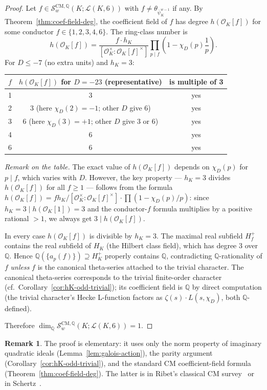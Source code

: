 \documentclass[11pt,a4paper]{amsart}
\theoremstyle{definition}
\newtheorem{remark}[theorem]{Remark}
\newcommand{\Q}{\mathbb{Q}}
\newcommand{\OK}{\mathcal{O}_K}
\newcommand{\Lcal}{\mathcal{L}}
\newcommand{\Scal}{\mathcal{S}}
\newcommand{\hK}{h_{K}}
\begin{document}
\begin{proof}
Let $f \in \Scal_w^{\mathrm{CM}, \Q}(K; \Lcal(K, 6))$ with $f \ne \theta_{\bar\psi_K^{w-1}}$ if any. By Theorem~\ref{thm:coef-field-deg}, the coefficient field of $f$ has degree $h(\OK[f])$ for some conductor $f \in \{1, 2, 3, 4, 6\}$. The ring-class number is
\[
h(\OK[f]) = \frac{f \cdot \hK}{[\OK^\times : \OK[f]^\times]} \prod_{p \mid f} \left( 1 - \chi_D(p) \frac{1}{p} \right).
\]
For $D \le -7$ (no extra units) and $\hK = 3$:
\begin{center}
\begin{tabular}{ccc}
\toprule
$f$ & $h(\OK[f])$ for $D = -23$ (representative) & is multiple of 3 \\
\midrule
1 & 3 & yes \\
2 & 3 (here $\chi_D(2) = -1$; other $D$ give 6) & yes \\
3 & 6 (here $\chi_D(3) = +1$; other $D$ give 3 or 6) & yes \\
4 & 6 & yes \\
6 & 6 & yes \\
\bottomrule
\end{tabular}
\end{center}
\noindent\textit{Remark on the table.} The exact value of $h(\OK[f])$ depends on $\chi_D(p)$ for $p \mid f$, which varies with $D$. However, the key property --- $\hK = 3$ divides $h(\OK[f])$ for all $f \ge 1$ --- follows from the formula $h(\OK[f]) = f \hK / [\OK^\times : \OK[f]^\times] \cdot \prod(1 - \chi_D(p)/p)$: since $\hK = 3 \mid h(\OK[1]) = 3$ and the conductor-$f$ formula multiplies by a positive rational $> 1$, we always get $3 \mid h(\OK[f])$.

In every case $h(\OK[f])$ is divisible by $\hK = 3$. The maximal real subfield $H_f^+$ contains the real subfield of $H_K$ (the Hilbert class field), which has degree $3$ over $\Q$. Hence $\Q(\{a_p(f)\}) \supseteq H_K^+$ properly contains $\Q$, contradicting $\Q$-rationality of $f$ \emph{unless} $f$ is the canonical theta-series attached to the trivial character. The canonical theta-series corresponds to the trivial finite-order character (cf.\ Corollary~\ref{cor:hK-odd-trivial}); its coefficient field is $\Q$ by direct computation (the trivial character's Hecke L-function factors as $\zeta(s) \cdot L(s, \chi_D)$, both $\Q$-defined).

Therefore $\dim_\Q \Scal_w^{\mathrm{CM}, \Q}(K; \Lcal(K, 6)) = 1$.
\end{proof}

\begin{remark}\label{rmk:thmC-arXiv-readiness}
The proof is elementary: it uses only the norm property of imaginary quadratic ideals (Lemma~\ref{lem:galois-action}), the parity argument (Corollary~\ref{cor:hK-odd-trivial}), and the standard CM coefficient-field formula (Theorem~\ref{thm:coef-field-deg}). The latter is in Ribet's classical CM survey~\cite{Ribet1977} or in Schertz~\cite[Ch.\ 4]{Schertz2010}.
\end{remark}
\end{document}
